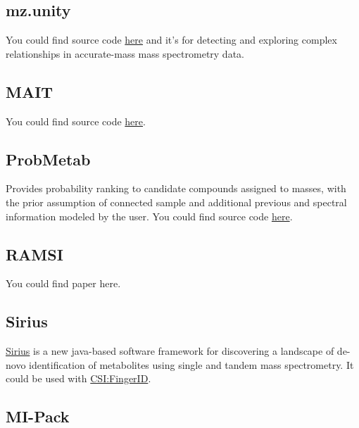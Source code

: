 \documentclass[
]{book}
\begin{document}
\hypertarget{mz.unity}{%
\subsection{mz.unity}\label{mz.unity}}

You could find source code \href{https://github.com/nathaniel-mahieu/mz.unity}{here}\citep{mahieu2016a} and it's for detecting and exploring complex relationships in accurate-mass mass spectrometry data.

\hypertarget{mait}{%
\subsection{MAIT}\label{mait}}

You could find source code \href{https://github.com/jpgroup/MAIT}{here}\citep{fernandez-albert2014a}.

\hypertarget{probmetab}{%
\subsection{ProbMetab}\label{probmetab}}

Provides probability ranking to candidate compounds assigned to masses, with the prior assumption of connected sample and additional previous and spectral information modeled by the user. You could find source code \href{https://github.com/rsilvabioinfo/ProbMetab}{here}\citep{silva2014}.

\hypertarget{ramsi}{%
\subsection{RAMSI}\label{ramsi}}

You could find paper here\citep{baran2013}.

\hypertarget{sirius}{%
\subsection{Sirius}\label{sirius}}

\href{https://bio.informatik.uni-jena.de/software/sirius/}{Sirius} is a new java-based software framework\citep{duhrkop2015} for discovering a landscape of de-novo identification of metabolites using single and tandem mass spectrometry. It could be used with \href{https://www.csi-fingerid.uni-jena.de/}{CSI:FingerID}.

\hypertarget{mi-pack}{%
\subsection{MI-Pack}\label{mi-pack}}
\end{document}
